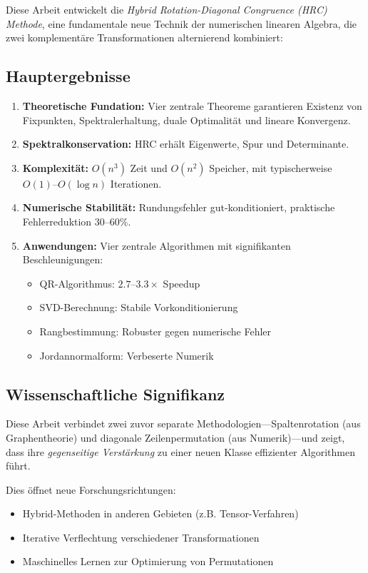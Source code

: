 \documentclass[a4paper,12pt]{article}
\theoremstyle{definition}
\begin{document}
Diese Arbeit entwickelt die \emph{Hybrid Rotation-Diagonal Congruence (HRC) Methode}, eine fundamentale neue Technik der numerischen linearen Algebra, die zwei komplementäre Transformationen alternierend kombiniert:

\subsection{Hauptergebnisse}

\begin{enumerate}
	\item \textbf{Theoretische Fundation:} Vier zentrale Theoreme garantieren Existenz von Fixpunkten, Spektralerhaltung, duale Optimalität und lineare Konvergenz.
	
	\item \textbf{Spektralkonservation:} HRC erhält Eigenwerte, Spur und Determinante.
	
	\item \textbf{Komplexität:} $O(n^3)$ Zeit und $O(n^2)$ Speicher, mit typischerweise $O(1)$--$O(\log n)$ Iterationen.
	
	\item \textbf{Numerische Stabilität:} Rundungsfehler gut-konditioniert, praktische Fehlerreduktion $30$--$60\%$.
	
	\item \textbf{Anwendungen:} Vier zentrale Algorithmen mit signifikanten Beschleunigungen:
	\begin{itemize}
		\item QR-Algorithmus: $2.7$--$3.3\times$ Speedup
		\item SVD-Berechnung: Stabile Vorkonditionierung
		\item Rangbestimmung: Robuster gegen numerische Fehler
		\item Jordannormalform: Verbeserte Numerik
	\end{itemize}
\end{enumerate}

\subsection{Wissenschaftliche Signifikanz}

Diese Arbeit verbindet zwei zuvor separate Methodologien—Spaltenrotation (aus Graphentheorie) und diagonale Zeilenpermutation (aus Numerik)—und zeigt, dass ihre \emph{gegenseitige Verstärkung} zu einer neuen Klasse effizienter Algorithmen führt.

Dies öffnet neue Forschungsrichtungen:
\begin{itemize}
	\item Hybrid-Methoden in anderen Gebieten (z.B. Tensor-Verfahren)
	\item Iterative Verflechtung verschiedener Transformationen
	\item Maschinelles Lernen zur Optimierung von Permutationen
\end{itemize}
\end{document}
